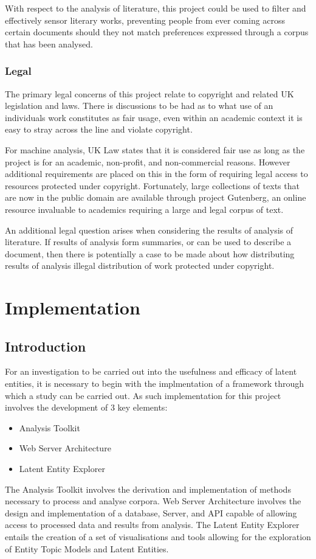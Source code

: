 \documentclass[10pt]{report}
\begin{document}
With respect to the analysis of literature, this project could be used to filter and effectively sensor literary works, preventing people from ever coming across certain documents should they not match preferences expressed through a corpus that has been analysed.

\subsection{Legal}
The primary legal concerns of this project relate to copyright and related UK legislation and laws. There is discussions to be had as to what use of an individuals work constitutes as fair usage, even within an academic context it is easy to stray across the line and violate copyright.

For machine analysis, UK Law states that it is considered fair use as long as the project is for an academic, non-profit, and non-commercial reasons. However additional requirements are placed on this in the form of requiring legal access to resources protected under copyright. Fortunately, large collections of texts that are now in the public domain are available through project Gutenberg, an online resource invaluable to academics requiring a large and legal corpus of text.

An additional legal question arises when considering the results of analysis of literature. If results of analysis form summaries, or can be used to describe a document, then there is potentially a case to be made about how distributing results of analysis illegal distribution of work protected under copyright.


%
%
%
%
%

\chapter{Implementation}
\section{Introduction}
For an investigation to be carried out into the usefulness and efficacy of latent entities, it is necessary to begin with the implmentation of a framework through which a study can be carried out. As such implementation for this project involves the development of 3 key elements:

\renewcommand{\baselinestretch}{0.5}\normalsize
\begin{itemize}
\item Analysis Toolkit
\item Web Server Architecture
\item Latent Entity Explorer
\end{itemize}
\renewcommand{\baselinestretch}{2.0}\normalsize
The Analysis Toolkit involves the derivation and implementation of methods necessary to process and analyse corpora. Web Server Architecture involves the design and implementation of a database, Server, and API capable of allowing access to processed data and results from analysis. The Latent Entity Explorer entails the creation of a set of visualisations and tools allowing for the exploration of Entity Topic Models and Latent Entities.
\end{document}
